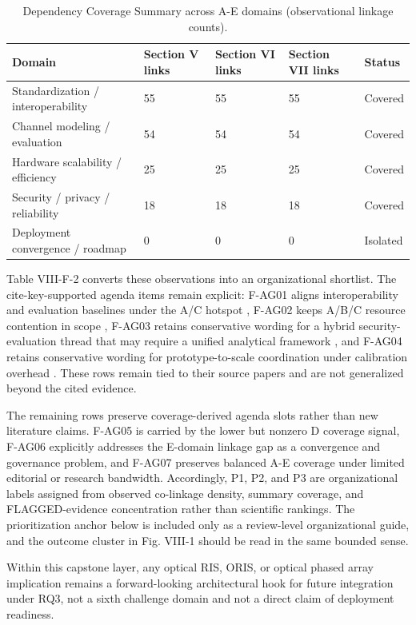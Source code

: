 \begin{table}[htbp]
\caption{Dependency Coverage Summary across A-E domains (observational linkage counts).}
\label{tab:viii_f_1}
\centering
\setlength{\tabcolsep}{4pt}
\renewcommand{\arraystretch}{1.08}
\begin{tabularx}{\textwidth}{L{3.6cm} C{1.7cm} C{1.7cm} C{1.7cm} Y}
\toprule
Domain & Section V links & Section VI links & Section VII links & Status \\
\midrule
Standardization / interoperability & 55 & 55 & 55 & Covered \\
Channel modeling / evaluation & 54 & 54 & 54 & Covered \\
Hardware scalability / efficiency & 25 & 25 & 25 & Covered \\
Security / privacy / reliability & 18 & 18 & 18 & Covered \\
Deployment convergence / roadmap & 0 & 0 & 0 & Isolated \\
\bottomrule
\end{tabularx}
\end{table}

Table VIII-F-2 converts these observations into an organizational shortlist. The cite-key-supported agenda items remain explicit: F-AG01 aligns interoperability and evaluation baselines under the A/C hotspot \cite{O_ISAC_133}, F-AG02 keeps A/B/C resource contention in scope \cite{O_ISAC_049}, F-AG03 retains conservative wording for a hybrid security-evaluation thread that may require a unified analytical framework \cite{O_ISAC_156}, and F-AG04 retains conservative wording for prototype-to-scale coordination under calibration overhead \cite{O_ISAC_107}. These rows remain tied to their source papers and are not generalized beyond the cited evidence.

The remaining rows preserve coverage-derived agenda slots rather than new literature claims. F-AG05 is carried by the lower but nonzero D coverage signal, F-AG06 explicitly addresses the E-domain linkage gap as a convergence and governance problem, and F-AG07 preserves balanced A-E coverage under limited editorial or research bandwidth. Accordingly, P1, P2, and P3 are organizational labels assigned from observed co-linkage density, summary coverage, and FLAGGED-evidence concentration rather than scientific rankings. The prioritization anchor below is included only as a review-level organizational guide, and the outcome cluster in Fig. VIII-1 should be read in the same bounded sense.

Within this capstone layer, any optical RIS, ORIS, or optical phased array implication remains a forward-looking architectural hook for future integration under RQ3, not a sixth challenge domain and not a direct claim of deployment readiness.

